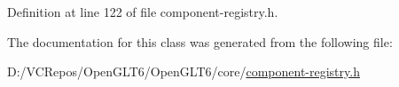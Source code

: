 Definition at line 122 of file component-\/registry.\+h.



The documentation for this class was generated from the following file\+:\begin{DoxyCompactItemize}
\item 
D\+:/\+V\+C\+Repos/\+Open\+G\+L\+T6/\+Open\+G\+L\+T6/core/\mbox{\hyperlink{component-registry_8h}{component-\/registry.\+h}}\end{DoxyCompactItemize}
